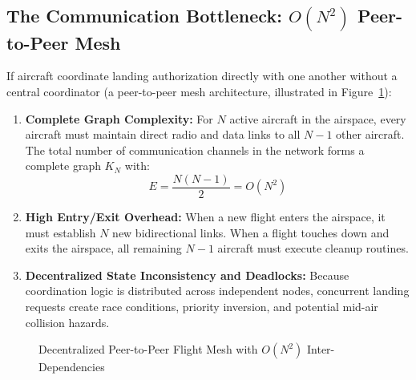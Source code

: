 \documentclass[12pt,a4paper]{article}
\begin{document}
\subsection{\texorpdfstring{The Communication Bottleneck: $O(N^2)$ Peer-to-Peer Mesh}{The Communication Bottleneck: O(N^2) Peer-to-Peer Mesh}}
If aircraft coordinate landing authorization directly with one another without a central coordinator (a peer-to-peer mesh architecture, illustrated in Figure~\ref{fig:p2p_mesh}):
\begin{enumerate}
    \item \textbf{Complete Graph Complexity:} For $N$ active aircraft in the airspace, every aircraft must maintain direct radio and data links to all $N-1$ other aircraft. The total number of communication channels in the network forms a complete graph $K_N$ with:
    \begin{equation}
        E = \frac{N(N-1)}{2} = O(N^2)
    \end{equation}
    \item \textbf{High Entry/Exit Overhead:} When a new flight enters the airspace, it must establish $N$ new bidirectional links. When a flight touches down and exits the airspace, all remaining $N-1$ aircraft must execute cleanup routines.
    \item \textbf{Decentralized State Inconsistency and Deadlocks:} Because coordination logic is distributed across independent nodes, concurrent landing requests create race conditions, priority inversion, and potential mid-air collision hazards.
\end{enumerate}

\begin{figure}[htbp]
\centering
{}
\caption{Decentralized Peer-to-Peer Flight Mesh with $O(N^2)$ Inter-Dependencies}
\label{fig:p2p_mesh}
\end{figure}
\end{document}
